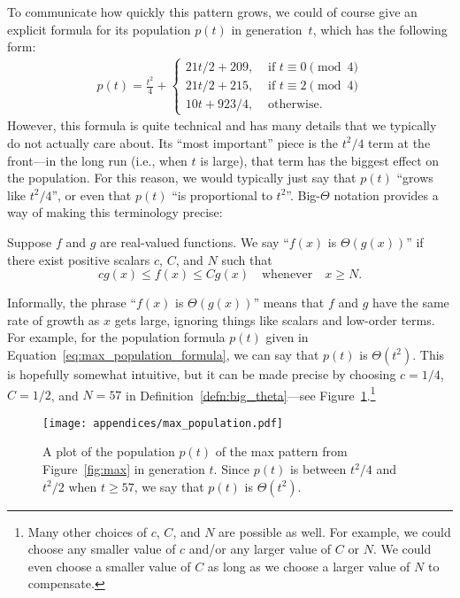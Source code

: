 To communicate how quickly this pattern grows, we could of course give an explicit formula for its population $p(t)$ in generation~$t$, which has the following form:
\begin{align}\label{eq:max_population_formula}
	p(t) = \frac{t^2}{4} + \begin{cases}
		21t/2 + 209, & \text{ if } t \equiv 0 \pmod{4} \\
		21t/2 + 215, & \text{ if } t \equiv 2 \pmod{4} \\
		10t + 923/4, & \text{ otherwise}.
	\end{cases}
\end{align}
However, this formula is quite technical and has many details that we typically do not actually care about. Its ``most important'' piece is the $t^2/4$ term at the front---in the long run (i.e., when $t$ is large), that term has the biggest effect on the population. For this reason, we would typically just say that $p(t)$ ``grows like $t^2/4$'', or even that $p(t)$ ``is proportional to $t^2$''. Big-$\Theta$ notation provides a way of making this terminology precise:

\begin{definition}\label{defn:big_theta}
	Suppose $f$ and $g$ are real-valued functions. We say ``$f(x)$ is $\Theta(g(x))$'' if there exist positive scalars $c$, $C$, and $N$ such that
	\[
		cg(x) \leq f(x) \leq Cg(x) \quad \text{whenever} \quad x \geq N.
	\]
\end{definition}

Informally, the phrase ``$f(x)$ is $\Theta(g(x))$'' means that $f$ and $g$ have the same rate of growth as $x$ gets large, ignoring things like scalars and low-order terms. For example, for the population formula $p(t)$ given in Equation~\eqref{eq:max_population_formula}, we can say that $p(t)$ is $\Theta(t^2)$. This is hopefully somewhat intuitive, but it can be made precise by choosing $c = 1/4$, $C = 1/2$, and $N = 57$ in Definition~\ref{defn:big_theta}---see Figure~\ref{fig:max_population_graph}.\footnote{Many other choices of $c$, $C$, and $N$ are possible as well. For example, we could choose any smaller value of $c$ and/or any larger value of $C$ or $N$. We could even choose a smaller value of $C$ as long as we choose a larger value of $N$ to compensate.}

\begin{figure}[!htbp]
	\centering
	\texttt{[image: appendices/max\_population.pdf]}
	\caption{A plot of the population $p(t)$ of the max pattern from Figure~\ref{fig:max} in generation $t$. Since $p(t)$ is between $t^2/4$ and $t^2/2$ when $t \geq 57$, we say that $p(t)$ is $\Theta(t^2)$.}\label{fig:max_population_graph}
\end{figure}

